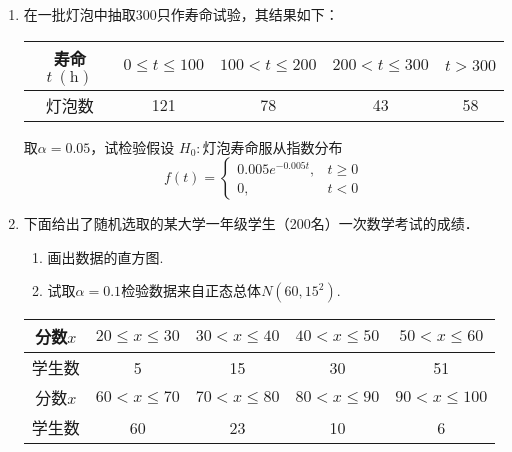 \documentclass[10pt,a4paper]{article}
\begin{document}
\begin{enumerate}
    \item 在一批灯泡中抽取300只作寿命试验，其结果如下：
    \renewcommand{\arraystretch}{1.3}
    \begin{table}[H]\centering
        \begin{tabular}{c|cccc}
        寿命$t\ (\mathrm{h})$ & $0\leq t\leq 100$ & $100<t\leq 200$ & $200<t\leq 300$ & $t>300$ \\ \hline
        灯泡数              & 121               & 78              & 43              & 58     
        \end{tabular}
    \end{table}
    \renewcommand{\arraystretch}{1.0}
    取$\alpha=0.05$，试检验假设
    $H_0:$灯泡寿命服从指数分布
    $$f(t)=\left\{\begin{array}{ll}
        0.005e^{-0.005t}, & t\geq 0 \\
        0, & t<0
    \end{array}\right.$$
    \clearpage


    \item 下面给出了随机选取的某大学一年级学生（200名）一次数学考试的成绩．
    \begin{enumerate}
        \item 画出数据的直方图.
        \item 试取$\alpha=0.1$检验数据来自正态总体$N(60,15^2)$.
    \end{enumerate}
    \renewcommand{\arraystretch}{1.3}
    \begin{table}[H]\centering
        \begin{tabular}{c|cccc}
        \hline
        分数$x$ & $20\leq x\leq 30$ & $30<x\leq 40$ & $40<x\leq 50$ & $50<x\leq 60$  \\ \hline
        学生数   & 5                 & 15            & 30            & 51             \\ \hline
        分数$x$ & $60<x\leq 70$     & $70<x\leq 80$ & $80<x\leq 90$ & $90<x\leq 100$ \\ \hline
        学生数   & 60                & 23            & 10            & 6              \\ \hline
        \end{tabular}
    \end{table}
    \renewcommand{\arraystretch}{1.0}
    \clearpage





\end{enumerate}
\end{document}
